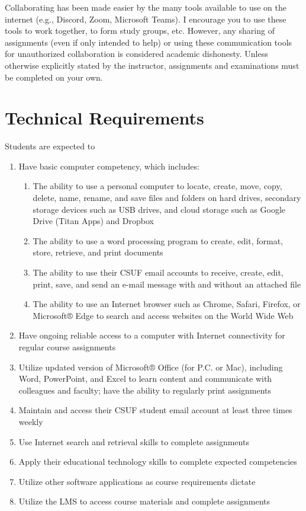 \documentclass{./../latex/syllabus}
\begin{document}
Collaborating has been made easier by the many tools available to use on the internet (e.g., Discord, Zoom, Microsoft Teams). I encourage you to use these tools to work together, to form study groups, etc. However, any sharing of assignments (even if only intended to help) or using these communication tools for unauthorized collaboration is considered academic dishonesty. Unless otherwise explicitly stated by the instructor, assignments and examinations must be completed on your own.

\section*{Technical Requirements}
Students are expected to
\begin{enumerate}
\item Have basic computer competency, which includes:
\begin{enumerate}
\item	The ability to use a personal computer to locate, create, move, copy, delete, name, rename, and save files and folders on hard drives, secondary storage devices such as USB drives, and cloud storage such as Google Drive (Titan Apps) and Dropbox
\item	The ability to use a word processing program to create, edit, format, store, retrieve, and print documents
\item	The ability to use their CSUF email accounts to receive, create, edit, print, save, and send an e-mail message with and without an attached file
\item	The ability to use an Internet browser such as Chrome, Safari, Firefox, or Microsoft® Edge to search and access websites on the World Wide Web
\end{enumerate}
\item	Have ongoing reliable access to a computer with Internet connectivity for regular course assignments
\item	Utilize updated version of Microsoft® Office (for P.C. or Mac), including Word, PowerPoint, and Excel to learn content and communicate with colleagues and faculty; have the ability to regularly print assignments
\item	Maintain and access their CSUF student email account at least three times weekly
\item	Use Internet search and retrieval skills to complete assignments
\item	Apply their educational technology skills to complete expected competencies
\item	Utilize other software applications as course requirements dictate
\item	Utilize the LMS to access course materials and complete assignments
\end{enumerate}
\end{document}
